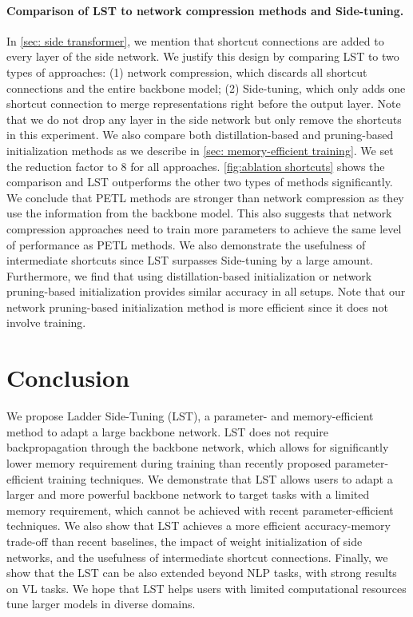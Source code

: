 \paragraph{Comparison of LST to network compression methods and Side-tuning.}

In \ref{sec: side transformer}, we mention that shortcut connections are added to every layer of the side network. We justify this design by comparing LST to two types of approaches: (1) network compression, which discards all shortcut connections and the entire backbone model; (2) Side-tuning, which only adds one shortcut connection to merge representations right before the output layer. Note that we do not drop any layer in the side network but only remove the shortcuts in this experiment. We also compare both distillation-based and pruning-based initialization methods as we describe in \ref{sec: memory-efficient training}. We set the reduction factor to 8 for all approaches.
\ref{fig:ablation shortcuts} shows the comparison and LST outperforms the other two types of methods significantly. We conclude that PETL methods are stronger than network compression as they use the information from the backbone model. This also suggests that network compression approaches need to train more parameters to achieve the same level of performance as PETL methods. We also demonstrate the usefulness of intermediate shortcuts since LST surpasses Side-tuning by a large amount. Furthermore, we find that using distillation-based initialization or network pruning-based initialization provides similar accuracy in all setups. Note that our network pruning-based initialization method is more efficient since it does not involve training.

\section{Conclusion}

We propose Ladder Side-Tuning (LST), a parameter- and memory-efficient method to adapt a large backbone network. LST does not require backpropagation through the backbone network, which allows for significantly lower memory requirement during training than recently proposed parameter-efficient training techniques. We demonstrate that LST allows users to adapt a larger and more powerful backbone network to target tasks with a limited memory requirement, which cannot be achieved with recent parameter-efficient techniques. We also show that LST achieves a more efficient accuracy-memory trade-off than recent baselines, the impact of weight initialization of side networks, and the usefulness of intermediate shortcut connections. Finally, we show that the LST can be also extended beyond NLP tasks, with strong results on VL tasks. We hope that LST helps users with limited computational resources tune larger models in diverse domains.


